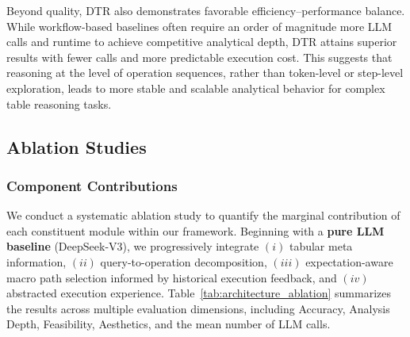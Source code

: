 Beyond quality, DTR also demonstrates favorable efficiency–performance balance. While workflow-based baselines often require an order of magnitude more LLM calls and runtime to achieve competitive analytical depth, DTR attains superior results with fewer calls and more predictable execution cost. This suggests that reasoning at the level of operation sequences, rather than token-level or step-level exploration, leads to more stable and scalable analytical behavior for complex table reasoning tasks.

\begin{table}[ht!]
\centering
\caption{Architecture ablation study of each components in DTR.}
\label{tab:architecture_ablation}
\vspace{-3mm}
\end{table}

\subsection{Ablation Studies}
\label{sec:ablation}
\subsubsection{Component Contributions}
We conduct a systematic ablation study to quantify the marginal contribution of each constituent module within our framework. Beginning with a \textbf{pure LLM baseline} (DeepSeek-V3), we progressively integrate \((i)\) tabular meta information, \((ii)\) query-to-operation decomposition, \((iii)\) expectation-aware macro path selection informed by historical execution feedback, and \((iv)\) abstracted execution experience. Table~\ref{tab:architecture_ablation} summarizes the results across multiple evaluation dimensions, including Accuracy, Analysis Depth, Feasibility, Aesthetics, and the mean number of LLM calls.

